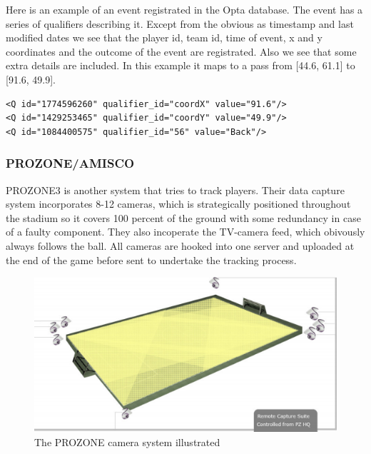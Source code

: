 Here is an example of an event registrated in the Opta database. The event has a series of qualifiers describing it. Except from the obvious as timestamp and last modified dates we see that the player id, team id, time of event, x and y coordinates and the outcome of the event are registrated. Also we see that some extra details are included. In this example it maps to a pass from [44.6, 61.1] to [91.6, 49.9].

\begin{lstlisting}
<Q id="1774596260" qualifier_id="coordX" value="91.6"/>
<Q id="1429253465" qualifier_id="coordY" value="49.9"/>
<Q id="1084400575" qualifier_id="56" value="Back"/>
\end{lstlisting}


\subsubsection{PROZONE/AMISCO}
PROZONE3  is another system that tries to track players. Their data capture system incorporates 8-12 cameras, which is strategically positioned throughout the stadium so it covers 100 percent of the ground with some redundancy in case of a faulty component. They also incoperate the TV-camera feed, which obivously always follows the ball. All cameras are hooked into one server and uploaded at the end of the game before sent to undertake the tracking process. 

\begin{figure}[ht!]
\centering
\includegraphics[width=150mm]{images/general/prozonecam.png}
\caption{The PROZONE camera system illustrated}
\label{overflow}
\end{figure}

